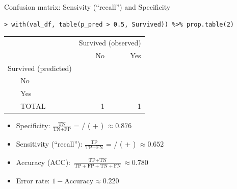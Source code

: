 \documentclass[xcolor=table,aspectratio=169]{beamer}
\begin{document}
\begin{frame}[fragile]
	{Confusion matrix: Sensivity (``recall'') and Specificity}
	
	\begin{scriptsize}
		\begin{verbatim}
> with(val_df, table(p_pred > 0.5, Survived)) %>% prop.table(2)
\end{verbatim}
	\end{scriptsize}\bigskip
	
	\begin{tabular}[h]{llrr}
		\toprule
		&    &\multicolumn{2}{c}{Survived (observed)}\\
		&   & No & Yes\\
		\midrule
		
		\multicolumn{2}{c}{Survived (predicted)}\\
		& No & \color{ForestGreen}{0.876} & \color{red}{0.348} \\
		& Yes & \color{red}{0.124} & \color{ForestGreen}{0.652}\\
		\midrule
		& TOTAL & 1 & 1\\
		\bottomrule
	\end{tabular}
	
	\bigskip
	\begin{itemize}
		\item Specificity: $\frac{\text{TN}}{\text{TN} + \text{FP}}$ =
		{\color{ForestGreen}{134}} / ({\color{ForestGreen}{134}} +
		{\color{red}{19}}) $\approx 0.876$
		\item Sensitivity (``recall''):
		$\frac{\text{TP}}{\text{TP} + \text{FN}}$ =
		{\color{ForestGreen}{75}} / ({\color{ForestGreen}{75}} +
		{\color{red}{40}}) $\approx 0.652$
		\item Accuracy (ACC):     $\frac{\text{TP} + \text{TN}}{\text{TP} + \text{FP} + \text{TN} + \text{FN}} \approx 0.780$
		\item Error rate: $1 - \text{Accuracy} \approx 0.220$
	\end{itemize}
\end{frame}
\end{document}
